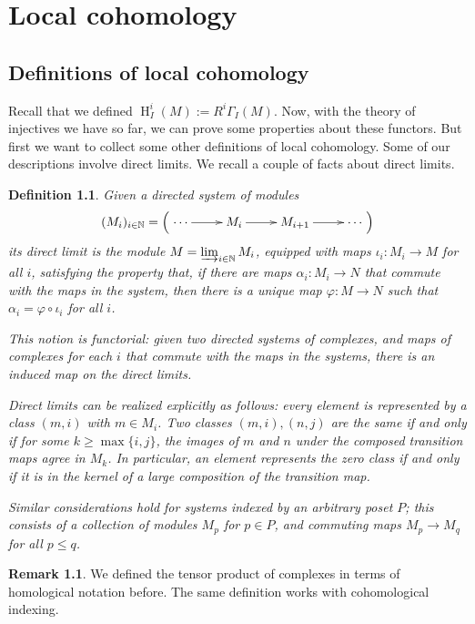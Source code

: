 \documentclass[11pt]{book}
\newtheorem{definition}[theorem]{Definition}
\numberwithin{equation}{section}
\numberwithin{theorem}{chapter}
\theoremstyle{definition}
\newtheorem*{basic properties}{Basic Properties}
\newtheorem*{Important Remark}{Important Remark}
\newtheorem{remark}[theorem]{Remark}
\theoremstyle{remark}
\newcommand{\NN}{\mathbb{N}}
\renewcommand{\H}{\operatorname{H}}
\begin{document}
\chapter{Local cohomology}

\section{Definitions of local cohomology}

Recall that we defined $\H^i_I(M) := R^i \Gamma_I(M)$. Now, with the theory of injectives we have so far, we can prove some properties about these functors. But first we want to collect some other definitions of local cohomology. Some of our descriptions involve direct limits. We recall a couple of facts about direct limits.

\begin{definition}
	Given a directed system of modules
	\[(M_i)_{i\in \NN} = \left( \xymatrix{\cdots \ar[r] & M_i \ar[r] & M_{i+1} \ar[r] & \cdots} \right)\]
	its \emph{direct limit} is the module $M=\varinjlim_{i\in \NN} M_i$, equipped with maps $\iota_i:M_i \to M$ for all $i$, satisfying the property that, if there are maps $\alpha_i:M_i \to N$ that commute with the maps in the system, then there is a unique map $\varphi: M\to N$ such that $\alpha_i=\varphi\circ \iota_i$ for all $i$.
	
This notion is functorial: given two directed systems of complexes, and maps of complexes for each $i$ that commute with the maps in the systems, there is an induced map on the direct limits.

Direct limits can be realized explicitly as follows: every element is represented by a class $(m, i)$ with $m\in M_i$. Two classes $(m,i),(n,j)$ are the same if and only if for some $k\geq\max\{i,j\}$, the images of $m$ and $n$ under the composed transition maps agree in $M_k$. In particular, an element represents the zero class if and only if it is in the kernel of a large composition of the transition map.

Similar considerations hold for systems indexed by an arbitrary poset $P$; this consists of a collection of modules $M_p$ for $p\in P$, and commuting maps $M_p\to M_q$ for all $p\leq q$.
\end{definition}

\begin{remark}
	We defined the tensor product of complexes in terms of homological notation before. The same definition works with cohomological indexing. 
\end{remark}
\end{document}

